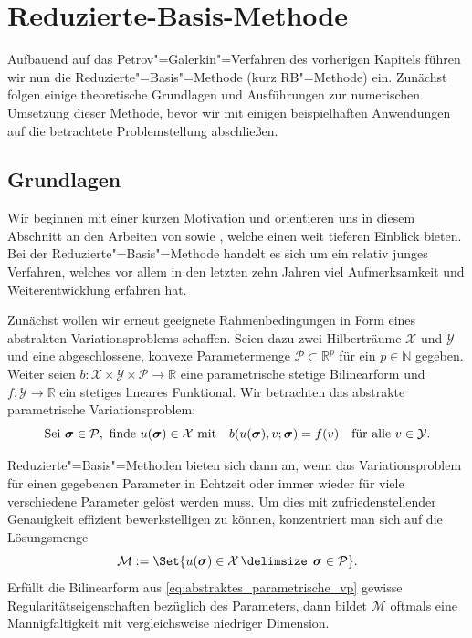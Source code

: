 \documentclass[../main.tex]{subfiles}
\begin{document}
\chapter{Reduzierte-Basis-Methode} %
\label{chapter:rbm}

Aufbauend auf das Petrov"=Galerkin"=Verfahren des vorherigen Kapitels führen wir nun die Reduzierte"=Basis"=Methode (kurz RB"=Methode) ein.
Zunächst folgen einige theoretische Grundlagen und Ausführungen zur numerischen Umsetzung dieser Methode, bevor wir mit einigen beispielhaften Anwendungen auf die betrachtete Problemstellung abschließen.

\section{Grundlagen} %
\label{sub:grb:rb:grundlagen}

Wir beginnen mit einer kurzen Motivation und orientieren uns in diesem Abschnitt an den Arbeiten von \textcite{Rozza2008} sowie \textcite{Patera:2007un}, welche einen weit tieferen Einblick bieten.
Bei der Reduzierte"=Basis"=Methode handelt es sich um ein relativ junges Verfahren, welches vor allem in den letzten zehn Jahren viel Aufmerksamkeit und Weiterentwicklung erfahren hat.

Zunächst wollen wir erneut geeignete Rahmenbedingungen in Form eines abstrakten Variationsproblems schaffen.
Seien dazu zwei Hilberträume $\mathcal X$ und $\mathcal Y$ und eine abgeschlossene, konvexe Parametermenge $\mathcal P \subset \mathbb{R}^{p}$ für ein $p \in \mathbb{N}$ gegeben.
Weiter seien $b \colon \mathcal X \times \mathcal Y \times \mathcal P \to \mathbb{R}$ eine parametrische stetige Bilinearform und $f \colon \mathcal Y \to \mathbb{R}$ ein stetiges lineares Funktional.
Wir betrachten das abstrakte parametrische Variationsproblem:
\begin{equation}
\label{eq:abstraktes_parametrische_vp}
    \text{Sei } \bm \sigma \in \mathcal P, \text{ finde } u(\bm \sigma) \in \mathcal X \text{ mit} \quad b(u(\bm \sigma), v; \bm \sigma) = f(v) \quad \fa v \in \mathcal Y.
\end{equation}

Reduzierte"=Basis"=Methoden bieten sich dann an, wenn das Variationsproblem für einen gegebenen Parameter in Echtzeit oder immer wieder für viele verschiedene Parameter gelöst werden muss.
Um dies mit zufriedenstellender Genauigkeit effizient bewerkstelligen zu können, konzentriert man sich auf die Lösungsmenge
\begin{equation}
\label{eq:stetige_loesungsmenge}
    \mathcal M := \Set{u(\bm \sigma) \in \mathcal X \given \bm \sigma \in \mathcal P}.
\end{equation}
Erfüllt die Bilinearform aus \cref{eq:abstraktes_parametrische_vp} gewisse Regularitätseigenschaften bezüglich des Parameters, dann bildet $\mathcal M$ oftmals eine Mannigfaltigkeit mit vergleichsweise niedriger Dimension.
\end{document}
